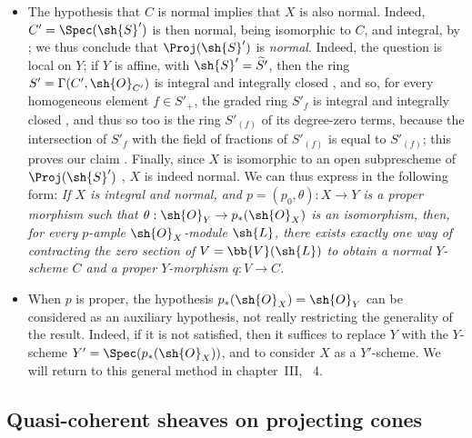 \begin{remark}[8.11.8]
\label{II.8.11.8}
\begin{itemize}
    \item[\rm{(i)}] The hypothesis that $C$ is normal implies that $X$ is also normal.
        Indeed, $C'=\Spec(\sh{S}')$ is then normal, being isomorphic to $C$, and integral, by ;
        we thus conclude that $\Proj(\sh{S}')$ is \emph{normal}.
        Indeed, the question is local on $Y$;
        if $Y$ is affine, with $\sh{S}'=\widetilde{S'}$, then the ring $S'=\Gamma(C',\sh{O}_{C'})$ is integral and integrally closed , and so, for every homogeneous element $f\in S'_+$, the graded ring $S'_f$ is integral and integrally closed \cite[t.~I, p.~257 and 261]{I-13}, and thus so too is the ring $S'_{(f)}$ of its degree-zero terms, because the intersection of $S'_f$ with the field of fractions of $S'_{(f)}$ is equal to $S'_{(f)}$;
        this proves our claim .
        Finally, since $X$ is isomorphic to an open subprescheme of $\Proj(\sh{S}')$ , $X$ is indeed normal.
        We can thus express  in the following form:
        \emph{If $X$ is integral and normal, and $p=(p_0,\theta):X\to Y$ is a proper morphism such that $\theta:\sh{O}_Y\to p_*(\sh{O}_X)$ is an isomorphism, then, for every $p$-ample $\sh{O}_X$-module $\sh{L}$, there exists exactly one way of contracting the zero section of $V=\bb{V}(\sh{L})$ to obtain a normal $Y$-scheme $C$ and a proper $Y$-morphism $q:V\to C$.}
    \item[\rm{(ii)}] When $p$ is proper, the hypothesis $p_*(\sh{O}_X)=\sh{O}_Y$ can be considered as an auxiliary hypothesis, not really restricting the generality of the result.
        Indeed, if it is not satisfied, then it suffices to replace $Y$ with the $Y$-scheme $Y'=\Spec(p_*(\sh{O}_X))$, and to consider $X$ as a $Y'$-scheme.
        We will return to this general method in chapter~III, \textsection~4.
\end{itemize}
\end{remark}


\subsection{Quasi-coherent sheaves on projecting cones}
\label{subsection:II.8.12}


